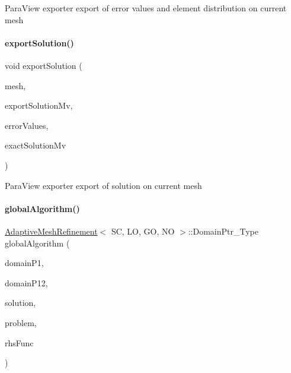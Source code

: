 Para\+View exporter export of error values and element distribution on current mesh \mbox{\label{classFEDD_1_1AdaptiveMeshRefinement_a2aef7d351efdf637713d5c34c2898672}} 
\paragraph{\texorpdfstring{export\+Solution()}{exportSolution()}}
{\footnotesize\ttfamily void export\+Solution (\begin{DoxyParamCaption}\item[{Mesh\+Unstr\+Ptr\+\_\+\+Type}]{mesh,  }\item[{Multi\+Vector\+Const\+Ptr\+\_\+\+Type}]{export\+Solution\+Mv,  }\item[{Multi\+Vector\+Const\+Ptr\+\_\+\+Type}]{error\+Values,  }\item[{Multi\+Vector\+Const\+Ptr\+\_\+\+Type}]{exact\+Solution\+Mv }\end{DoxyParamCaption})}

Para\+View exporter export of solution on current mesh \mbox{\label{classFEDD_1_1AdaptiveMeshRefinement_ac695e101f66364a347d05451ec3e1a26}} 
\paragraph{\texorpdfstring{global\+Algorithm()}{globalAlgorithm()}}
{\footnotesize\ttfamily \hyperlink{classFEDD_1_1AdaptiveMeshRefinement}{Adaptive\+Mesh\+Refinement}$<$ SC, LO, GO, NO $>$\+::Domain\+Ptr\+\_\+\+Type global\+Algorithm (\begin{DoxyParamCaption}\item[{Domain\+Ptr\+\_\+\+Type}]{domain\+P1,  }\item[{Domain\+Ptr\+\_\+\+Type}]{domain\+P12,  }\item[{Block\+Multi\+Vector\+Const\+Ptr\+\_\+\+Type}]{solution,  }\item[{Problem\+Ptr\+\_\+\+Type}]{problem,  }\item[{Rhs\+Func\+\_\+\+Type}]{rhs\+Func }\end{DoxyParamCaption})}




